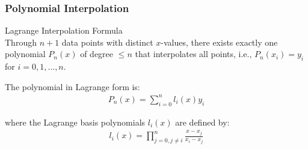 \subsubsection{Polynomial Interpolation}

\begin{theorem}{Lagrange Interpolation Formula}\\
Through $n+1$ data points with distinct $x$-values, there exists exactly one polynomial $P_n(x)$ of degree $\leq n$ that interpolates all points, i.e., $P_n(x_i) = y_i$ for $i=0,1,\ldots,n$.

The polynomial in Lagrange form is:
\begin{align*}
P_n(x) = \sum_{i=0}^{n} l_i(x)y_i
\end{align*}

where the Lagrange basis polynomials $l_i(x)$ are defined by:
\begin{align*}
l_i(x) = \prod_{j=0, j\neq i}^{n} \frac{x - x_j}{x_i - x_j}
\end{align*}
\end{theorem}

